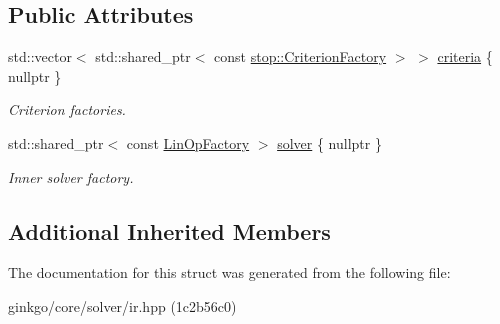 \subsection*{Public Attributes}
\begin{DoxyCompactItemize}
\item 
\mbox{\label{structgko_1_1solver_1_1Ir_1_1parameters__type_af0f31d5343e290f7974cd780c7be27cc}} 
std\+::vector$<$ std\+::shared\+\_\+ptr$<$ const \hyperlink{group__stop_gab12a51109c50b35ec36dc5a393d6a9a0}{stop\+::\+Criterion\+Factory} $>$ $>$ \hyperlink{structgko_1_1solver_1_1Ir_1_1parameters__type_af0f31d5343e290f7974cd780c7be27cc}{criteria} \{ nullptr \}
\begin{DoxyCompactList}\small\item\em Criterion factories. \end{DoxyCompactList}\item 
\mbox{\label{structgko_1_1solver_1_1Ir_1_1parameters__type_a787aaabdad4c273ef2ec9ff93672db82}} 
std\+::shared\+\_\+ptr$<$ const \hyperlink{classgko_1_1LinOpFactory}{Lin\+Op\+Factory} $>$ \hyperlink{structgko_1_1solver_1_1Ir_1_1parameters__type_a787aaabdad4c273ef2ec9ff93672db82}{solver} \{ nullptr \}
\begin{DoxyCompactList}\small\item\em Inner solver factory. \end{DoxyCompactList}\end{DoxyCompactItemize}
\subsection*{Additional Inherited Members}


The documentation for this struct was generated from the following file\+:\begin{DoxyCompactItemize}
\item 
ginkgo/core/solver/ir.\+hpp (1c2b56c0)\end{DoxyCompactItemize}
